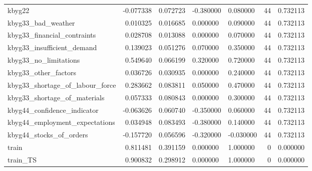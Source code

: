 \begin{landscape}
\begin{longtable}[h!]{lrrllrr}
kbyg22 & -0.077338 & 0.072723 & -0.380000 & 0.080000 & 44 & 0.732113 \\
kbyg33_bad_weather & 0.010325 & 0.016685 & 0.000000 & 0.090000 & 44 & 0.732113 \\
kbyg33_financial_contraints & 0.028708 & 0.013088 & 0.000000 & 0.070000 & 44 & 0.732113 \\
kbyg33_insufficient_demand & 0.139023 & 0.051276 & 0.070000 & 0.350000 & 44 & 0.732113 \\
kbyg33_no_limitations & 0.549640 & 0.066199 & 0.320000 & 0.720000 & 44 & 0.732113 \\
kbyg33_other_factors & 0.036726 & 0.030935 & 0.000000 & 0.240000 & 44 & 0.732113 \\
kbyg33_shortage_of_labour_force & 0.283662 & 0.083811 & 0.050000 & 0.470000 & 44 & 0.732113 \\
kbyg33_shortage_of_materials & 0.057333 & 0.080843 & 0.000000 & 0.300000 & 44 & 0.732113 \\
kbyg44_confidence_indicator & -0.063626 & 0.060740 & -0.350000 & 0.060000 & 44 & 0.732113 \\
kbyg44_employment_expectations & 0.034948 & 0.083493 & -0.380000 & 0.140000 & 44 & 0.732113 \\
kbyg44_stocks_of_orders & -0.157720 & 0.056596 & -0.320000 & -0.030000 & 44 & 0.732113 \\
train & 0.811481 & 0.391159 & 0.000000 & 1.000000 & 0 & 0.000000 \\
train_TS & 0.900832 & 0.298912 & 0.000000 & 1.000000 & 0 & 0.000000 \\
\end{longtable}\end{landscape}
